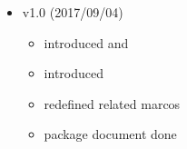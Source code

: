 \begin{itemize}
\item v1.0 (2017/09/04)
  \begin{itemize}
  \item introduced \cmd{\cntmlevdist} and \cmd{\cntmsibdist}
  \item introduced \cmd{\cntmdistance}
  \item redefined related marcos
  \item package document done
  \end{itemize}

\end{itemize}
